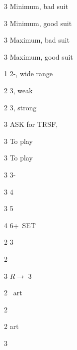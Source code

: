 \documentclass[12pt, a4paper]{article}
\begin{document}
\begin{compoptions}[1]
    \item[3\clubs] Minimum, bad suit
    \item[3\diams] Minimum, good suit
    \item[3\hearts] Maximum, bad suit
    \item[3\spades] Maximum, good suit
\end{compoptions}
\vspace*{1em}


\begin{compoptions}[2]
    \item[1\nt] 2-\spades, wide range
    \item[2\spades] 3\spades, weak
    \item[2\clubs] 3\spades, strong
\end{compoptions}
\vspace*{1em}



\begin{compoptions}[3]
    \item[3\diams] ASK for TRSF, \gf
    \item[3\hearts] To play
    \item[3\spades] To play   
\end{compoptions}
\vspace*{1em}


\begin{compoptions}[4]
    \item[3\hearts] 3-\spades
    \item[3\spades] 4\spades
    \item[3\nt] 5\spades
    \item[4\clubs] 6+\spades\ SET   
\end{compoptions}
\pagebreak



\sequence{{1\diams}{1\spades}{2\diams}{2\hearts}}
\begin{options}[1]
    \item[2\spades] 3\spades
    \item[2\nt] \nat
    \item[3\clubs] $R\rightarrow$  3\diams
\end{options}

\vspace*{1em}

\sequence{{1\diams}{1\spades}{2\diams}}
\begin{options}[2]
    \item[2\hearts] \gf\ art
    \item[2\spades] \nat
    \item[2\nt] \inv art
    \item[3\clubs] \nat
\end{options}
\end{document}
